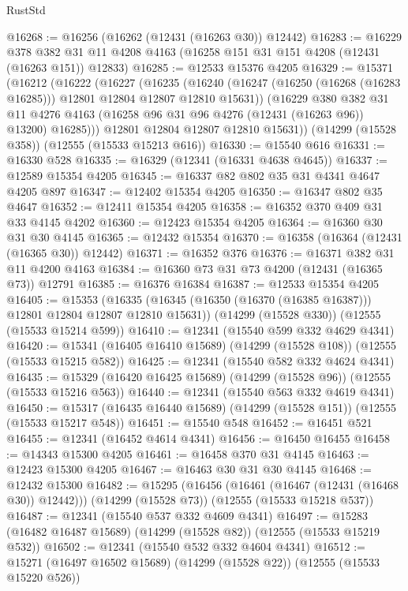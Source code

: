 \begin{lexlean}{RustStd}
\begin{coremodule}
@16268 := @16256 (@16262 (@12431 (@16263 @30)) @12442)
@16283 := @16229
    @378
    @382
    @31
    @11
    @4208
    @4163
    (@16258 @151 @31 @151 @4208 (@12431 (@16263 @151)) @12833)
@16285 := @12533 @15376 @4205
@16329 := @15371
    (@16212
      (@16222
        (@16227
          (@16235
            (@16240 (@16247 (@16250 (@16268 (@16283 @16285))) @12801 @12804 @12807 @12810 @15631))
            (@16229
              @380
              @382
              @31
              @11
              @4276
              @4163
              (@16258 @96 @31 @96 @4276 (@12431 (@16263 @96)) @13200)
              @16285)))
        @12801
        @12804
        @12807
        @12810
        @15631))
    (@14299 (@15528 @358))
    (@12555 (@15533 @15213 @616))
@16330 := @15540 @616
@16331 := @16330 @528
@16335 := @16329 (@12341 (@16331 @4638 @4645))
@16337 := @12589 @15354 @4205
@16345 := @16337 @82 @802 @35 @31 @4341 @4647 @4205 @897
@16347 := @12402 @15354 @4205
@16350 := @16347 @802 @35 @4647
@16352 := @12411 @15354 @4205
@16358 := @16352 @370 @409 @31 @33 @4145 @4202
@16360 := @12423 @15354 @4205
@16364 := @16360 @30 @31 @30 @4145
@16365 := @12432 @15354
@16370 := @16358 (@16364 (@12431 (@16365 @30)) @12442)
@16371 := @16352 @376
@16376 := @16371 @382 @31 @11 @4200 @4163
@16384 := @16360 @73 @31 @73 @4200 (@12431 (@16365 @73)) @12791
@16385 := @16376 @16384
@16387 := @12533 @15354 @4205
@16405 := @15353
    (@16335 (@16345 (@16350 (@16370 (@16385 @16387))) @12801 @12804 @12807 @12810 @15631))
    (@14299 (@15528 @330))
    (@12555 (@15533 @15214 @599))
@16410 := @12341 (@15540 @599 @332 @4629 @4341)
@16420 := @15341 (@16405 @16410 @15689) (@14299 (@15528 @108)) (@12555 (@15533 @15215 @582))
@16425 := @12341 (@15540 @582 @332 @4624 @4341)
@16435 := @15329 (@16420 @16425 @15689) (@14299 (@15528 @96)) (@12555 (@15533 @15216 @563))
@16440 := @12341 (@15540 @563 @332 @4619 @4341)
@16450 := @15317 (@16435 @16440 @15689) (@14299 (@15528 @151)) (@12555 (@15533 @15217 @548))
@16451 := @15540 @548
@16452 := @16451 @521
@16455 := @12341 (@16452 @4614 @4341)
@16456 := @16450 @16455
@16458 := @14343 @15300 @4205
@16461 := @16458 @370 @31 @4145
@16463 := @12423 @15300 @4205
@16467 := @16463 @30 @31 @30 @4145
@16468 := @12432 @15300
@16482 := @15295
    (@16456 (@16461 (@16467 (@12431 (@16468 @30)) @12442)))
    (@14299 (@15528 @73))
    (@12555 (@15533 @15218 @537))
@16487 := @12341 (@15540 @537 @332 @4609 @4341)
@16497 := @15283 (@16482 @16487 @15689) (@14299 (@15528 @82)) (@12555 (@15533 @15219 @532))
@16502 := @12341 (@15540 @532 @332 @4604 @4341)
@16512 := @15271 (@16497 @16502 @15689) (@14299 (@15528 @22)) (@12555 (@15533 @15220 @526))

\end{coremodule}
\end{lexlean}
